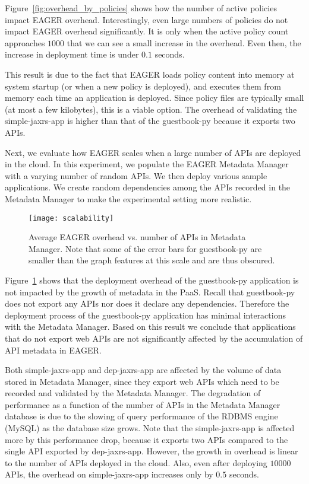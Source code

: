 Figure~\ref{fig:overhead_by_policies} shows how the number of active policies
impact EAGER overhead. Interestingly, even large numbers of policies 
do not impact EAGER overhead significantly. It is only when the active
policy count approaches $1000$ that we can see a small increase in the
overhead. Even then, the increase in deployment time is under $0.1$ seconds. 

This result is due to the fact that EAGER loads policy content into memory at system
startup (or when a new policy is deployed), and executes them from memory each
time an application is deployed. Since policy files are typically small (at
most a few kilobytes), this is a viable option. The overhead of validating the
simple-jaxrs-app is higher than that of the guestbook-py because it exports two APIs.

Next, we evaluate how EAGER scales when a large number of APIs are deployed 
in the cloud. In this experiment, we populate the EAGER
Metadata Manager with a varying number of random APIs. We then deploy various sample 
applications. We create random dependencies among the APIs recorded in the 
Metadata Manager to make the experimental setting more realistic.

\begin{figure}
\centering
\texttt{[image: scalability]}
\caption{Average EAGER overhead vs. number of APIs in Metadata Manager. Note that some of the error bars for
guestbook-py are smaller than the graph features at this scale and are thus obscured.}
\label{fig:scalability}
\vspace{-0.2in}
\end{figure}

Figure~\ref{fig:scalability} shows that the deployment overhead of the 
guestbook-py application is not impacted by the growth of metadata
in the PaaS. Recall that guestbook-py does not export any APIs nor does it 
declare any dependencies. Therefore the deployment process of
the guestbook-py application has minimal interactions with the 
Metadata Manager. Based on this result we conclude that applications that
do not export web APIs are not significantly affected by the accumulation 
of API metadata in EAGER.

Both simple-jaxrs-app and dep-jaxrs-app are
affected by the volume of data stored in Metadata Manager, since they
export web APIs which need to be recorded and validated by the Metadata Manager.
The degradation 
of performance as a function of the number of APIs in the Metadata Manager
database is due to the slowing of query performance of the RDBMS engine (MySQL) 
as the database size grows. Note that the simple-jaxrs-app
is affected more by this performance drop, because it exports two APIs compared to the single API exported 
by dep-jaxrs-app. However, the growth
in overhead is linear to the number of APIs deployed in the cloud. Also,
even after deploying $10000$ APIs, the overhead on simple-jaxrs-app increases only by 
$0.5$ seconds.


